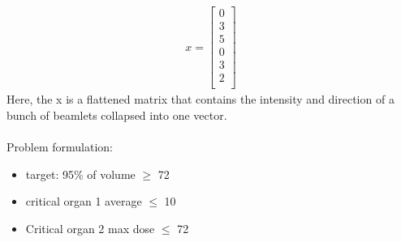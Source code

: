 \begin{align}
  x = 
  \begin{bmatrix}
     0 \\
     3 \\
     5 \\
     0 \\
     3 \\
     2 \\
  \end{bmatrix}
\end{align} 
Here, the x is a flattened matrix that contains the intensity and direction of a bunch of beamlets collapsed into one vector.
\\ \\
Problem formulation:
\begin{itemize}
  \item target: 95\% of volume $\geq$ 72
  \item critical organ 1 average $\leq$ 10
  \item Critical organ 2 max dose $\leq$ 72
\end{itemize}

